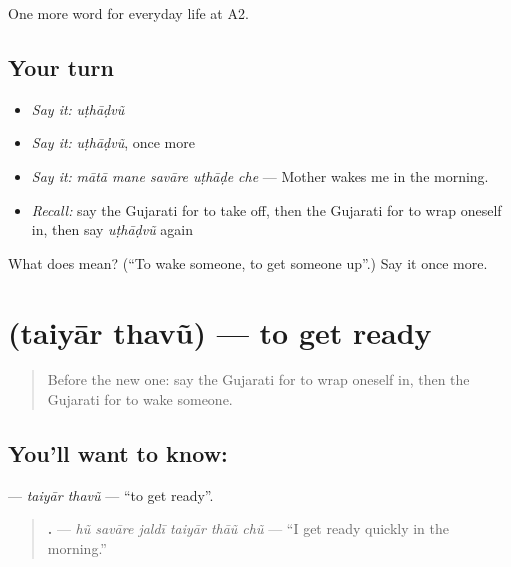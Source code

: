 \begin{grammarlens}[title={What you've built}]
One more word for everyday life at A2.
\end{grammarlens}

\subsection*{Your turn}
\begin{itemize}
\raggedright
  \item \emph{Say it:} \emph{uṭhāḍvũ}
  \item \emph{Say it:} \emph{uṭhāḍvũ}, once more
  \item \emph{Say it:} \emph{mātā mane savāre uṭhāḍe che} — Mother wakes me in the morning.
  \item \emph{Recall:} say the Gujarati for to take off, then the Gujarati for to wrap oneself in, then say \emph{uṭhāḍvũ} again
\end{itemize}

\begin{tcolorbox}[breakable,colback=teal!4,colframe=teal!35!black,title={Before you move on}]
What does  mean? (\textquotedblleft{}To wake someone, to get someone up\textquotedblright{}.) Say it once more.
\end{tcolorbox}
\section[\texorpdfstring{\gu{તૈયાર} \gu{થવું} (taiyār thavũ)}{તૈયાર થવું (taiyār thavũ)}]{  (taiyār thavũ) — to get ready}

\label{lesson:GU-C155-taiyar-thavu}



\begin{quote}
Before the new one: say the Gujarati for to wrap oneself in, then the Gujarati for to wake someone.
\end{quote}

\subsection*{You'll want to know:  }
\textbf{ } — \emph{taiyār thavũ} — \textquotedblleft{}to get ready\textquotedblright{}.

\begin{quote}
\textbf{     .} — \emph{hũ savāre jaldī taiyār thāũ chũ} — \textquotedblleft{}I get ready quickly in the morning.\textquotedblright{}
\end{quote}

